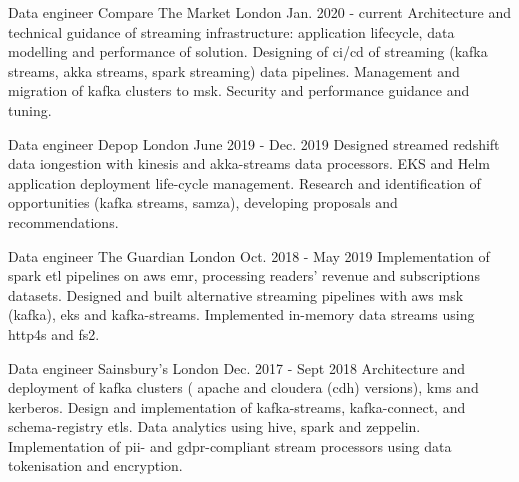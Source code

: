 
\newcommand*{\logo}[2]{\raisebox{-0.2em}{\texttt{[image: \#2]}}\hspace{0.25em}#1}

\begin{cventries}

  \cventry
    {Data engineer} %
    {\logo{\ctm Compare The Market}{../../../images/ctm.png}} %
    {London} %
    {Jan. 2020 - current} %
    {} %
    {
      Architecture and technical guidance of streaming infrastructure: application lifecycle, data modelling and performance of solution. 
      Designing of ci/cd of streaming (kafka streams, akka streams, spark streaming) data pipelines.
      Management and migration of kafka clusters to msk. Security and performance guidance and tuning. 
    }

  

  \cventry
    {Data engineer} %
    {\logo{\depop Depop}{../../../images/depop.jpg}} %
    {London} %
    {June 2019 - Dec. 2019} %
    {}
    {
      Designed streamed redshift data iongestion with kinesis and akka-streams data processors.
      EKS and Helm application deployment life-cycle management.
      Research and identification of opportunities (kafka streams, samza), developing proposals and recommendations.
    }

  \cventry
    {Data engineer} %
    {\logo{\guardian The Guardian}{../../../images/guardian.png}} %
    {London} %
    {Oct. 2018 - May 2019} %
    {} %
    {
 {Implementation of spark etl pipelines on aws emr, processing readers' revenue and subscriptions datasets.}
 {Designed and built alternative streaming pipelines with aws msk (kafka), eks and kafka-streams.}
 {Implemented in-memory data streams using http4s and fs2.}
    }

  \cventry
    {Data engineer} %
    {\logo{\sainsburys Sainsbury's}{../../../images/sainsburys.jpg}} %
    {London} %
    {Dec. 2017 - Sept 2018} %
    {} %
    {
{Architecture and deployment of kafka clusters ( apache and cloudera (cdh) versions), kms and kerberos.}
{Design and implementation of kafka-streams, kafka-connect, and schema-registry etls. Data analytics using hive, spark and zeppelin.}
{Implementation of pii- and gdpr-compliant stream processors using data tokenisation and encryption.}
    }


\end{cventries}
